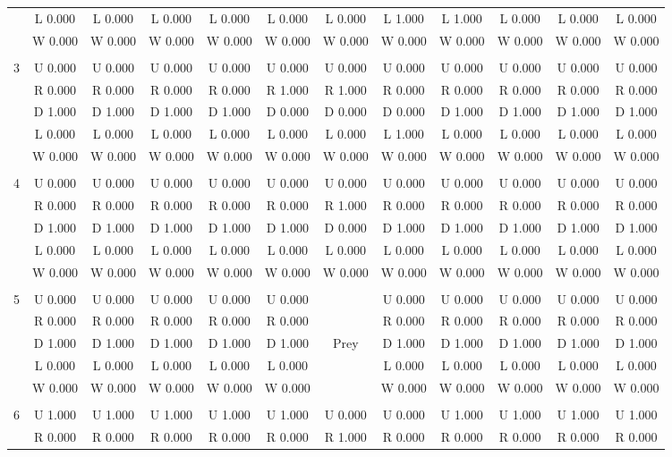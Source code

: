 \begin{table}[htbp]
\begin{tiny}
\begin{tabular}{c|c|c|c|c|c|c|c|c|c|c|c|}
&L 0.000&L 0.000&L 0.000&L 0.000&L 0.000&L 0.000&L 1.000&L 1.000&L 0.000&L 0.000&L 0.000\\
&W 0.000&W 0.000&W 0.000&W 0.000&W 0.000&W 0.000&W 0.000&W 0.000&W 0.000&W 0.000&W 0.000\\
\hline \\
3&U 0.000&U 0.000&U 0.000&U 0.000&U 0.000&U 0.000&U 0.000&U 0.000&U 0.000&U 0.000&U 0.000\\
&R 0.000&R 0.000&R 0.000&R 0.000&R 1.000&R 1.000&R 0.000&R 0.000&R 0.000&R 0.000&R 0.000\\
&D 1.000&D 1.000&D 1.000&D 1.000&D 0.000&D 0.000&D 0.000&D 1.000&D 1.000&D 1.000&D 1.000\\
&L 0.000&L 0.000&L 0.000&L 0.000&L 0.000&L 0.000&L 1.000&L 0.000&L 0.000&L 0.000&L 0.000\\
&W 0.000&W 0.000&W 0.000&W 0.000&W 0.000&W 0.000&W 0.000&W 0.000&W 0.000&W 0.000&W 0.000\\
\hline \\
4&U 0.000&U 0.000&U 0.000&U 0.000&U 0.000&U 0.000&U 0.000&U 0.000&U 0.000&U 0.000&U 0.000\\
&R 0.000&R 0.000&R 0.000&R 0.000&R 0.000&R 1.000&R 0.000&R 0.000&R 0.000&R 0.000&R 0.000\\
&D 1.000&D 1.000&D 1.000&D 1.000&D 1.000&D 0.000&D 1.000&D 1.000&D 1.000&D 1.000&D 1.000\\
&L 0.000&L 0.000&L 0.000&L 0.000&L 0.000&L 0.000&L 0.000&L 0.000&L 0.000&L 0.000&L 0.000\\
&W 0.000&W 0.000&W 0.000&W 0.000&W 0.000&W 0.000&W 0.000&W 0.000&W 0.000&W 0.000&W 0.000\\
\hline \\
5&U 0.000&U 0.000&U 0.000&U 0.000&U 0.000&&U 0.000&U 0.000&U 0.000&U 0.000&U 0.000\\
&R 0.000&R 0.000&R 0.000&R 0.000&R 0.000&&R 0.000&R 0.000&R 0.000&R 0.000&R 0.000\\
&D 1.000&D 1.000&D 1.000&D 1.000&D 1.000&Prey&D 1.000&D 1.000&D 1.000&D 1.000&D 1.000\\
&L 0.000&L 0.000&L 0.000&L 0.000&L 0.000&&L 0.000&L 0.000&L 0.000&L 0.000&L 0.000\\
&W 0.000&W 0.000&W 0.000&W 0.000&W 0.000&&W 0.000&W 0.000&W 0.000&W 0.000&W 0.000\\
\hline \\
6&U 1.000&U 1.000&U 1.000&U 1.000&U 1.000&U 0.000&U 0.000&U 1.000&U 1.000&U 1.000&U 1.000\\
&R 0.000&R 0.000&R 0.000&R 0.000&R 0.000&R 1.000&R 0.000&R 0.000&R 0.000&R 0.000&R 0.000\\

\end{tabular}
\end{tiny}
\end{table}

